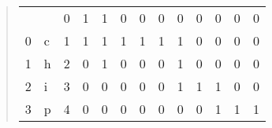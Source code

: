 \begin{quote}
\begin{table}[H]
\begin{tabular}{lllllllllllll}
            &   & \multicolumn{1}{l|}{0} & \multicolumn{1}{l|}{\cellcolor[HTML]{FFFC9E}1} & \multicolumn{1}{l|}{\cellcolor[HTML]{9AFF99}1} & \multicolumn{1}{l|}{0}                         & \multicolumn{1}{l|}{0}                         & \multicolumn{1}{l|}{0}                         & \multicolumn{1}{l|}{0}                         & \multicolumn{1}{l|}{0}                         & \multicolumn{1}{l|}{0}                         & \multicolumn{1}{l|}{0}                         & \multicolumn{1}{l|}{0}                         \\ \cline{4-13} 
          0 & c & \multicolumn{1}{l|}{1} & \multicolumn{1}{l|}{\cellcolor[HTML]{9AFF99}1} & \multicolumn{1}{l|}{\cellcolor[HTML]{FFFC9E}1} & \multicolumn{1}{l|}{\cellcolor[HTML]{FFFC9E}1} & \multicolumn{1}{l|}{\cellcolor[HTML]{FFFC9E}1} & \multicolumn{1}{l|}{\cellcolor[HTML]{FFFC9E}1} & \multicolumn{1}{l|}{\cellcolor[HTML]{FFFC9E}1} & \multicolumn{1}{l|}{0}                         & \multicolumn{1}{l|}{0}                         & \multicolumn{1}{l|}{0}                         & \multicolumn{1}{l|}{0}                         \\ \cline{4-13} 
          1 & h & \multicolumn{1}{l|}{2} & \multicolumn{1}{l|}{0}                         & \multicolumn{1}{l|}{1}                         & \multicolumn{1}{l|}{0}                         & \multicolumn{1}{l|}{0}                         & \multicolumn{1}{l|}{0}                         & \multicolumn{1}{l|}{\cellcolor[HTML]{FFFC9E}1} & \multicolumn{1}{l|}{0}                         & \multicolumn{1}{l|}{0}                         & \multicolumn{1}{l|}{0}                         & \multicolumn{1}{l|}{0}                         \\ \cline{4-13} 
          2 & i & \multicolumn{1}{l|}{3} & \multicolumn{1}{l|}{0}                         & \multicolumn{1}{l|}{0}                         & \multicolumn{1}{l|}{0}                         & \multicolumn{1}{l|}{0}                         & \multicolumn{1}{l|}{0}                         & \multicolumn{1}{l|}{\cellcolor[HTML]{FFFC9E}1} & \multicolumn{1}{l|}{\cellcolor[HTML]{FFFC9E}1} & \multicolumn{1}{l|}{\cellcolor[HTML]{FFFC9E}1} & \multicolumn{1}{l|}{0}                         & \multicolumn{1}{l|}{0}                         \\ \cline{4-13} 
          3 & p & \multicolumn{1}{l|}{4} & \multicolumn{1}{l|}{0}                         & \multicolumn{1}{l|}{0}                         & \multicolumn{1}{l|}{0}                         & \multicolumn{1}{l|}{0}                         & \multicolumn{1}{l|}{0}                         & \multicolumn{1}{l|}{0}                         & \multicolumn{1}{l|}{0}                         & \multicolumn{1}{l|}{\cellcolor[HTML]{FFFC9E}1} & \multicolumn{1}{l|}{\cellcolor[HTML]{FFFC9E}1} & \multicolumn{1}{l|}{\cellcolor[HTML]{FFFC9E}1} \\ \cline{4-13} 

\end{tabular}
\end{table}
\end{quote}
